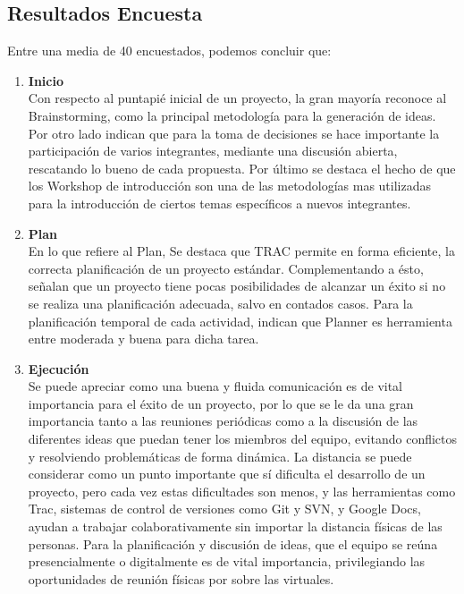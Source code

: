 \subsection{Resultados Encuesta}

Entre una media de 40 encuestados, podemos concluir que:

\begin{enumerate}

\item \textbf{Inicio}\\
Con respecto al puntapié inicial de un proyecto, la gran mayoría reconoce al Brainstorming,
como la principal metodología para la generación de ideas. Por otro lado indican que
para la toma de decisiones se hace importante la participación de varios integrantes,
mediante una discusión abierta, rescatando lo bueno de cada propuesta. Por último se destaca
el hecho de que los Workshop de introducción son una de las metodologías mas utilizadas 
para la introducción de ciertos temas específicos a nuevos integrantes.

\item \textbf{Plan}\\
En lo que refiere al Plan, Se destaca que TRAC permite en forma eficiente, la correcta
planificación de un proyecto estándar. Complementando a ésto, señalan que un proyecto tiene
pocas posibilidades de alcanzar un éxito si no se realiza una planificación adecuada, salvo
en contados casos. Para la planificación temporal de cada actividad, indican que Planner es 
herramienta entre moderada y buena para dicha tarea.

\item \textbf{Ejecución}\\
Se puede apreciar como una buena y fluida comunicación es de vital importancia
para el éxito de un proyecto, por lo que se le da una gran importancia tanto a
las reuniones periódicas como a la discusión de las diferentes ideas que
puedan tener los miembros del equipo, evitando conflictos y resolviendo
problemáticas de forma dinámica. La distancia se puede considerar como un
punto importante que sí dificulta el desarrollo de un proyecto, pero cada vez
estas dificultades son menos, y las herramientas como Trac, sistemas de
control de versiones como Git y SVN, y Google Docs, ayudan a trabajar
colaborativamente sin importar la distancia físicas de las personas. Para la
planificación y discusión de ideas, que el equipo se reúna presencialmente o
digitalmente es de vital importancia, privilegiando las oportunidades de
reunión físicas por sobre las virtuales.


\end{enumerate}
